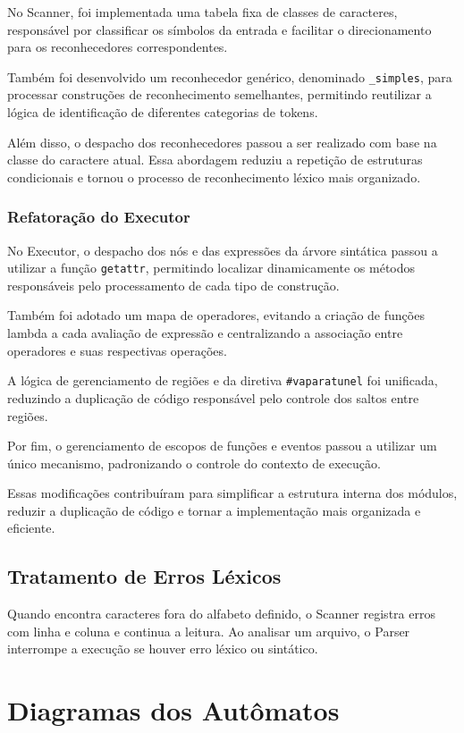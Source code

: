 \documentclass[12pt,a4paper]{article}
\begin{document}
No Scanner, foi implementada uma tabela fixa de classes de caracteres, responsável por classificar os símbolos da entrada e facilitar o direcionamento para os reconhecedores correspondentes.

Também foi desenvolvido um reconhecedor genérico, denominado \texttt{\_simples}, para processar construções de reconhecimento semelhantes, permitindo reutilizar a lógica de identificação de diferentes categorias de tokens.

Além disso, o despacho dos reconhecedores passou a ser realizado com base na classe do caractere atual. Essa abordagem reduziu a repetição de estruturas condicionais e tornou o processo de reconhecimento léxico mais organizado.

\subsubsection{Refatoração do Executor}

No Executor, o despacho dos nós e das expressões da árvore sintática passou a utilizar a função \texttt{getattr}, permitindo localizar dinamicamente os métodos responsáveis pelo processamento de cada tipo de construção.

Também foi adotado um mapa de operadores, evitando a criação de funções lambda a cada avaliação de expressão e centralizando a associação entre operadores e suas respectivas operações.

A lógica de gerenciamento de regiões e da diretiva \texttt{\#vaparatunel} foi unificada, reduzindo a duplicação de código responsável pelo controle dos saltos entre regiões.

Por fim, o gerenciamento de escopos de funções e eventos passou a utilizar um único mecanismo, padronizando o controle do contexto de execução.

Essas modificações contribuíram para simplificar a estrutura interna dos módulos, reduzir a duplicação de código e tornar a implementação mais organizada e eficiente.


\subsection{Tratamento de Erros Léxicos}

Quando encontra caracteres fora do alfabeto definido, o Scanner registra erros com linha e coluna e continua a leitura. Ao analisar um arquivo, o Parser interrompe a execução se houver erro léxico ou sintático.


\section{Diagramas dos Autômatos}
\end{document}
